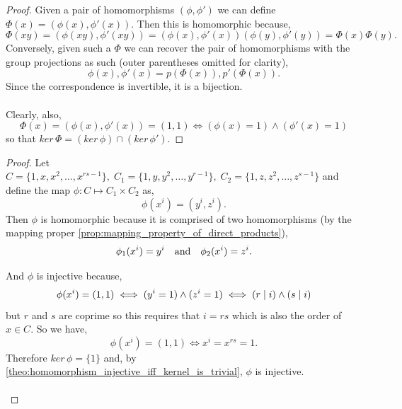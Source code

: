 \documentclass[MathsNotesBase.tex]{subfiles}
\begin{document}
{		
		\begin{proof}
			Given a pair of homomorphisms ${ (\phi,\phi') }$ we can define ${ \Phi(x) = (\phi(x), \phi'(x)) }$. Then this is homomorphic because,
			\[ \Phi(xy) = (\phi(xy), \phi'(xy)) = (\phi(x), \phi'(x))(\phi(y), \phi'(y)) = \Phi(x)\Phi(y). \]
			Conversely, given such a $\Phi$ we can recover the pair of homomorphisms with the group projections as such (outer parentheses omitted for clarity),
			\[ \phi(x), \phi'(x) = p(\Phi(x)), p'(\Phi(x)). \]
			Since the correspondence is invertible, it is a bijection.\\\\
			Clearly, also, 
			\[ \Phi(x) = (\phi(x), \phi'(x)) = (1,1) \iff (\phi(x) = 1) \wedge (\phi'(x) = 1) \]
			so that ${ ker\,\Phi = (ker\,\phi) \cap (ker\,\phi') }$.
		\end{proof}	
	
		\bigskip
		\begin{proof}
			Let ${ C = \{1,x,x^2,\dots,x^{rs-1}\},\; C_1 = \{1,y,y^2,\dots,y^{r-1}\},\; C_2 = \{1,z,z^2,\dots,z^{s-1}\} }$ and define the map ${ \phi: C \longmapsto C_1 \times C_2 }$ as,
			\[ \phi(x^i) = (y^i, z^i). \]
			Then $\phi$ is homomorphic because it is comprised of two homomorphisms (by the mapping proper \autoref{prop:mapping_property_of_direct_products}),
			\[ \phi_1(x^i) = y^i \hspace{10pt}\text{and}\hspace{10pt} \phi_2(x^i) = z^i. \]
			
			And $\phi$ is injective because,
			\[ \phi(x^i) = (1,1) \iff (y^i = 1) \wedge (z^i = 1) \iff (r \mid i) \wedge (s \mid i) \]
			but $r$ and $s$ are coprime so this requires that ${ i = rs }$ which is also the order of ${ x \in C }$. So we have,
			\[ \phi(x^i) = (1,1) \iff x^i = x^{rs} = 1. \]
			Therefore ${ ker\,\phi = \{1\} }$ and, by \autoref{theo:homomorphism_injective_iff_kernel_is_trivial}, $\phi$ is injective.\\\\
			

\end{proof}}
\end{document}
